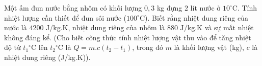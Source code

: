 \begin{bt}%
	Một ấm đun nước bằng nhôm có khối lượng $0{,}3$ kg đựng $2$ lít nước ở $10^\circ$C. Tính nhiệt lượng cần thiết để đun sôi nước ($100^\circ$C). Biết rằng nhiệt dung riêng của nước là $4200$  J/kg.K, nhiệt dung riêng của nhôm là $880$ J/kg.K và sự mất nhiệt không đáng kể. 
	(Cho biết công thức tính nhiệt lượng vật thu vào để tăng nhiệt độ từ $t_1$$^\circ$C lên $t_2$$^\circ$C là $Q = m.c (t_2 - t_1)$, trong đó $m$ là khối lượng vật (kg), $c$ là nhiệt dung riêng (J/kg.K)).	
\end{bt}

